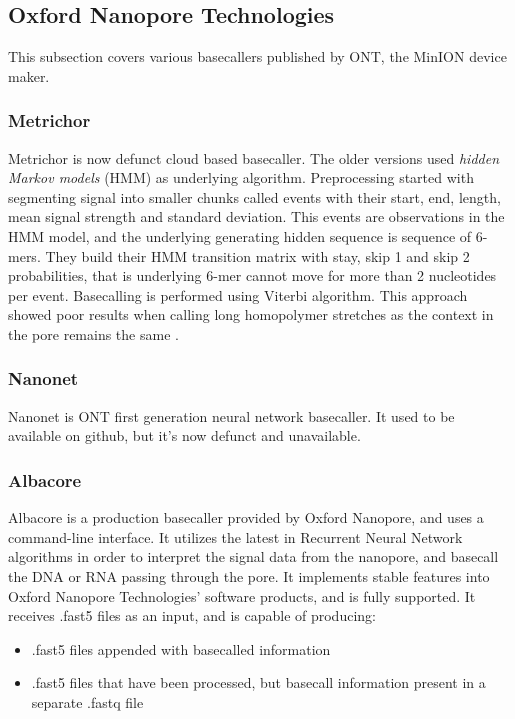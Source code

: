 \documentclass[times, utf8, diplomski, english]{fer}
\begin{document}
\subsection{Oxford Nanopore Technologies}
This subsection covers various basecallers published by ONT, the MinION device maker.
\subsubsection{Metrichor}

Metrichor is now defunct cloud based basecaller. The older versions used \textit{hidden Markov models} (HMM) as underlying algorithm. Preprocessing started with segmenting signal into smaller chunks called events with their start, end, length, mean signal strength and standard deviation. This events are observations in the HMM model, and the underlying generating hidden sequence is sequence of 6-mers. They build their HMM transition matrix with stay, skip 1 and skip 2 probabilities, that is underlying 6-mer cannot move for more than 2 nucleotides per event. Basecalling is performed using Viterbi algorithm. This approach showed poor results when calling long homopolymer stretches as the context in the pore remains the same \cite{homopolymers}\cite{homopolimeri_analiza}.

\subsubsection{Nanonet}
Nanonet is ONT first generation neural network basecaller. It used to be available on github, but it's now defunct and unavailable.

\subsubsection{Albacore}
Albacore is a production basecaller provided by Oxford Nanopore, and uses a command-line interface. It
utilizes the latest in Recurrent Neural Network algorithms in order to interpret the signal data from the
nanopore, and basecall the DNA or RNA passing through the pore. It implements stable features into
Oxford Nanopore Technologies’ software products, and is fully supported. It receives .fast5 files as an
input, and is capable of producing: 
\begin{itemize}
    \item .fast5 files appended with basecalled information
    \item .fast5 files that have been processed, but basecall information present in a separate .fastq file
\end{itemize}
\end{document}
